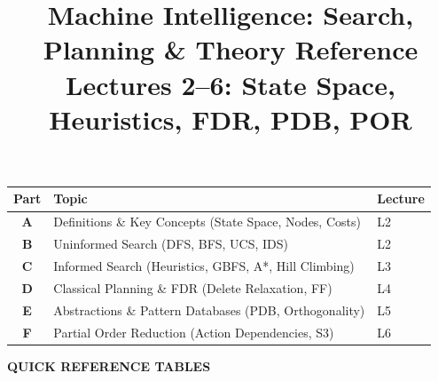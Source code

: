 \documentclass[11pt,a4paper]{article}
\title{\textbf{Machine Intelligence: Search, Planning \& Theory Reference}\\
\large Lectures 2--6: State Space, Heuristics, FDR, PDB, POR}
\author{}
\date{}
\begin{document}
\maketitle
\vspace{-1em}

\begin{center}
\begin{tabular}{|c|l|l|}
\hline
\textbf{Part} & \textbf{Topic} & \textbf{Lecture} \\
\hline
\textbf{A} & Definitions \& Key Concepts (State Space, Nodes, Costs) & L2 \\
\textbf{B} & Uninformed Search (DFS, BFS, UCS, IDS) & L2 \\
\textbf{C} & Informed Search (Heuristics, GBFS, A*, Hill Climbing) & L3 \\
\textbf{D} & Classical Planning \& FDR (Delete Relaxation, FF) & L4 \\
\textbf{E} & Abstractions \& Pattern Databases (PDB, Orthogonality) & L5 \\
\textbf{F} & Partial Order Reduction (Action Dependencies, S3) & L6 \\
\hline
\end{tabular}
\end{center}

\vspace{-0.5em}
\tableofcontents

\newpage

\begin{center}
\textbf{\LARGE QUICK REFERENCE TABLES}
\end{center}
\vspace{0.5em}
\end{document}
